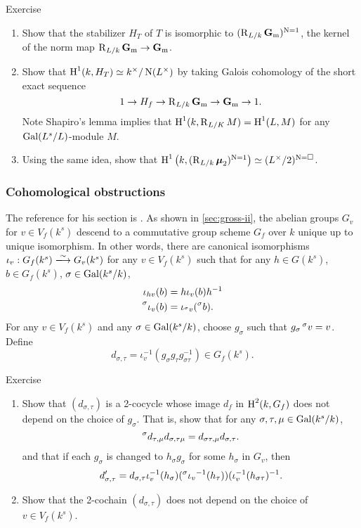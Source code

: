 \begin{enonce*}[remark]{Exercise}
\begin{enumerate}
  \item Show that the stabilizer $H_T$ of $T$ is isomorphic to 
    $(\operatorname{R}_{L/k}\mathbf{G}_{\mathrm{m}})^{\operatorname{N}=1}$, the kernel of the norm 
    map $\operatorname{R}_{L/k}\mathbf{G}_{\mathrm{m}}\to\mathbf{G}_{\mathrm{m}}$. 
  \item Show that $\operatorname{H}^1(k,H_T)  \simeq k^\times/\operatorname{N}(L^\times)$ by taking 
    Galois cohomology of the short exact sequence 
    \[
      1 \to H_f \to \operatorname{R}_{L/k}\mathbf{G}_{\mathrm{m}} \to \mathbf{G}_{\mathrm{m}} \to 1 .
    \]
    Note Shapiro's lemma implies that $\operatorname{H}^1(k,\operatorname{R}_{L/K} M) = \operatorname{H}^1(L,M)$ 
    for any $\operatorname{Gal}(L^s/L)$-module $M$. 
  \item Using the same idea, show that 
    $\operatorname{H}^1\left(k,(\operatorname{R}_{L/k}\boldsymbol\mu_2)^{\operatorname{N}=1}\right) \simeq (L^\times/2)^{\operatorname{N}=\square}$. 
\end{enumerate}
\end{enonce*}


\subsubsection{Cohomological obstructions}

The reference for his section is \cite[\S 2]{bgw13}. As shown in 
\autoref{sec:gross-ii}, the abelian groups $G_v$ for $v\in V_f(k^s)$ descend to 
a commutative group scheme $G_f$ over $k$ unique up to unique isomorphism. In 
other words, there are canonical isomorphisms $\iota_v:G_f(k^s)\iso G_v(k^s)$ 
for any $v\in V_f(k^s)$ such that for any $h\in G(k^s)$, $b\in G_f(k^s)$, 
$\sigma\in \operatorname{Gal}(k^s/k)$, 
\begin{align*}
  \iota_{h v}(b) &= h \iota_v(b) h^{-1} \\
  \prescript{\sigma}{}{\iota_v(b)} &= \iota_{\prescript{\sigma}{}{v}}(\prescript{\sigma}{}{b}) .
\end{align*}
For any $v\in V_f(k^s)$ and any $\sigma\in \operatorname{Gal}(k^s/k)$, choose $g_\sigma$ 
such that $g_\sigma \prescript{\sigma}{}{v}=v$. Define 
\[
  d_{\sigma,\tau} = \iota_v^{-1}(g_\sigma g_\tau g_{\sigma\tau}^{-1}) \in G_f(k^s) .
\]

\begin{enonce*}[remark]{Exercise}
\begin{enumerate}
  \item Show that $(d_{\sigma,\tau})$ is a 2-cocycle whose image $d_f$ in 
    $\operatorname{H}^2(k,G_f)$ does not depend on the choice of $g_\sigma$. That is, show 
    that for any $\sigma,\tau,\mu\in \operatorname{Gal}(k^s/k)$, 
    \[
      \prescript{\sigma}{}{d_{\tau,\mu}} d_{\sigma,\tau\mu} = d_{\sigma\tau,\mu} d_{\sigma,\tau} .
    \]
    and that if each $g_\sigma$ is changed to $h_\sigma g_\sigma$ for some 
    $h_\sigma$ in $G_v$, then 
    \[
      d_{\sigma,\tau}' = d_{\sigma,\tau} \iota_v^{-1} (h_\sigma) (\prescript{\sigma}{}{\iota_v}^{-1}(h_\tau)) (\iota_v^{-1}(h_{\sigma\tau})^{-1} .
    \]
  \item Show that the 2-cochain $(d_{\sigma,\tau})$ does not depend on the 
    choice of $v\in V_f(k^s)$. 
\end{enumerate}
\end{enonce*}

